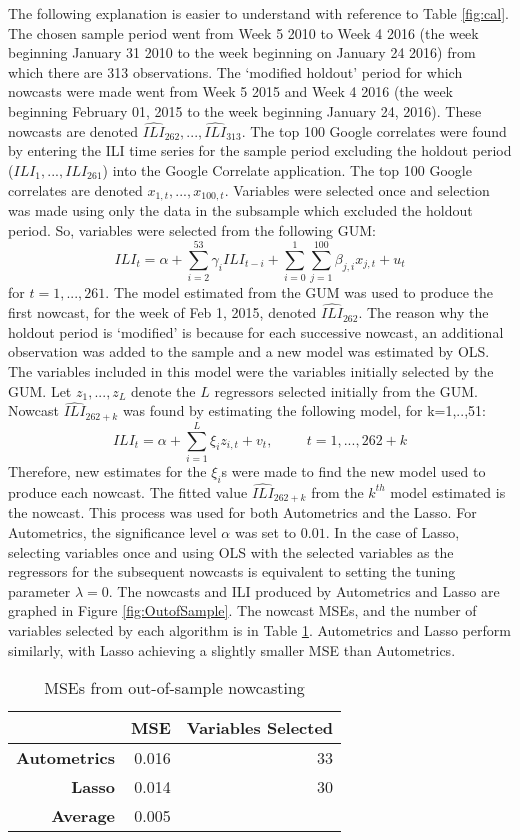 The following explanation is easier to understand with reference to Table \ref{fig:cal}. The chosen sample period went from Week 5 2010 to Week 4 2016 (the week beginning January 31 2010 to the week beginning on January 24 2016) from which there are 313 observations. The `modified holdout' period for which nowcasts were made went from Week 5 2015 and Week 4 2016 (the week beginning February 01, 2015 to the week beginning January 24, 2016). These nowcasts are denoted $\widehat{ILI}_{262},...,\widehat{ILI}_{313}$.  The top 100 Google correlates were found by entering the ILI time series for the sample period excluding the holdout period ($ILI_{1},...,ILI_{261}$) into the Google Correlate application. The top 100 Google correlates are denoted $x_{1,t},...,x_{100,t}$. Variables were selected once and selection was made using only the data in the subsample which excluded the holdout period. So, variables were selected from the following GUM:
$$ILI_{t}= \alpha + \sum_{i=2}^{53}\gamma_{i}ILI_{t-i}+ \sum_{i=0}^{1}\sum_{j=1}^{100}\beta_{j,i}x_{j,t}+u_{t}$$
for $t=1,...,261$. The model estimated from the GUM was used to produce the first nowcast, for the week of Feb 1, 2015, denoted $\widehat{ILI}_{262}$. The reason why the holdout period is `modified' is because for each successive nowcast, an additional observation was added to the sample and a new model was estimated by OLS. The variables included in this model were the variables initially selected by the GUM. Let $z_{1},...,z_{L}$ denote the $L$ regressors selected initially from the GUM. Nowcast $\widehat{ILI}_{262+k}$ was found by estimating the following model, for k=1,..,51:
$$ILI_{t}= \alpha + \sum_{i=1}^{L}\xi_{i}z_{i,t}+ v_{t}, \hspace{1cm} t=1,...,262+k$$
Therefore, new estimates for the $\xi_{i}$s were made to find the new model used to produce each nowcast. The fitted value $\widehat{ILI}_{262+k}$ from the $k^{th}$ model estimated is the nowcast. This process was used for both Autometrics and the Lasso. For Autometrics, the significance level $\alpha$ was set to $0.01$. In the case of Lasso, selecting variables once and using OLS with the selected variables as the regressors for the subsequent nowcasts is equivalent to setting the tuning parameter $\lambda = 0$. The nowcasts and ILI produced by Autometrics and Lasso are graphed in Figure \ref{fig:OutofSample}. The nowcast MSEs, and the number of variables selected by each algorithm is in Table \ref{MSEoutofsample}. Autometrics and Lasso perform similarly, with Lasso achieving a slightly smaller MSE than Autometrics. 
\begin{table}[h]
\centering
\begin{tabular}{r|r|r}
 & \textbf{MSE}& \textbf{Variables Selected} \\
 \hline
\textbf{Autometrics} & 0.016 & 33\\
\textbf{Lasso} & 0.014 & 30 \\
\hline
\textbf{Average} & 0.005 &\\

    \end{tabular}%
      \caption{MSEs from out-of-sample nowcasting}
  \label{MSEoutofsample}%
\end{table}%


